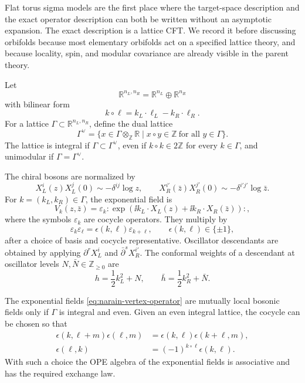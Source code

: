 Flat torus sigma models are the first place where the target-space
description and the exact operator description can both be written without
an asymptotic expansion.  The exact description is a lattice CFT.  We record
it before discussing orbifolds because most elementary orbifolds act on a
specified lattice theory, and because locality, spin, and modular covariance
are already visible in the parent theory.

Let
\[
  \mathbb R^{n_L,n_R}
  =
  \mathbb R^{n_L}\oplus\mathbb R^{n_R}
\]
with bilinear form
\[
  k\circ \ell
  =
  k_L\cdot \ell_L-k_R\cdot \ell_R .
\]
For a lattice \(\Gamma\subset\mathbb R^{n_L,n_R}\), define the dual lattice
\[
  \Gamma^\vee
  =
  \{x\in\Gamma\otimes_{\mathbb Z}\mathbb R\mid
    x\circ y\in\mathbb Z\ \text{for all }y\in\Gamma\}.
\]
The lattice is integral if \(\Gamma\subset\Gamma^\vee\), even if
\(k\circ k\in2\mathbb Z\) for every \(k\in\Gamma\), and unimodular if
\(\Gamma=\Gamma^\vee\).

The chiral bosons are normalized by
\[
  X_L^i(z)X_L^j(0)\sim-\delta^{ij}\log z,
  \qquad
  X_R^{i'}(\bar z)X_R^{j'}(0)\sim-\delta^{i'j'}\log\bar z .
\]
For \(k=(k_L,k_R)\in\Gamma\), the exponential field is
\begin{equation}
  V_k(z,\bar z)
  =
  \varepsilon_k:
  \exp\!\left(\ii k_L\cdot X_L(z)+\ii k_R\cdot X_R(\bar z)\right): ,
  \label{eq:narain-vertex-operator}
\end{equation}
where the symbols \(\varepsilon_k\) are cocycle operators.  They multiply by
\begin{equation}
  \varepsilon_k\varepsilon_\ell
  =
  \epsilon(k,\ell)\varepsilon_{k+\ell},
  \qquad
  \epsilon(k,\ell)\in\{\pm1\},
  \label{eq:narain-cocycle-multiplication}
\end{equation}
after a choice of basis and cocycle representative.  Oscillator descendants
are obtained by applying \(\partial^rX_L^i\) and
\(\bar\partial^sX_R^{i'}\).  The conformal weights of a descendant at
oscillator levels \(N,\bar N\in\mathbb Z_{\ge0}\) are
\begin{equation}
  h=\frac12 k_L^2+N,
  \qquad
  \bar h=\frac12 k_R^2+\bar N .
  \label{eq:narain-lattice-weights}
\end{equation}

\begin{proposition}
\label{prop:narain-locality-spin-cocycle}
The exponential fields \eqref{eq:narain-vertex-operator} are mutually local
bosonic fields only if \(\Gamma\) is integral and even.  Given an even
integral lattice, the cocycle can be chosen so that
\begin{align}
  \epsilon(k,\ell+m)\epsilon(\ell,m)
  &=
  \epsilon(k,\ell)\epsilon(k+\ell,m),
  \label{eq:narain-cocycle-associativity}
  \\
  \epsilon(\ell,k)
  &=
  (-1)^{k\circ\ell}\epsilon(k,\ell).
  \label{eq:narain-cocycle-exchange}
\end{align}
With such a choice the OPE algebra of the exponential fields is associative
and has the required exchange law.
\end{proposition}

